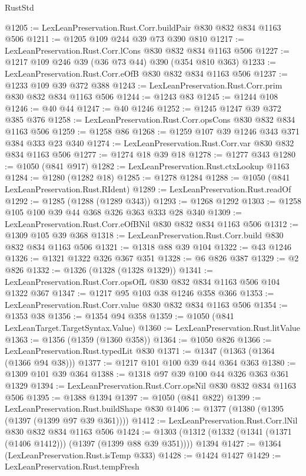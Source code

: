 \begin{lexlean}{RustStd}
\begin{coremodule}
@1205 := LexLeanPreservation.Rust.Corr.buildPair @830 @832 @834 @1163 @506
@1211 := @1205 @109 @244 @39 @73 @390 @810
@1217 := LexLeanPreservation.Rust.Corr.lCons @830 @832 @834 @1163 @506
@1227 := @1217 @109 @246 @39 (@36 @73 @44) @390 (@354 @810 @363)
@1233 := LexLeanPreservation.Rust.Corr.eOfB @830 @832 @834 @1163 @506
@1237 := @1233 @109 @39 @372 @388
@1243 := LexLeanPreservation.Rust.Corr.prim @830 @832 @834 @1163 @506
@1244 := @1243 @83
@1245 := @1244 @108
@1246 := @40 @44
@1247 := @40 @1246
@1252 := @1245 @1247 @39 @372 @385 @376
@1258 := LexLeanPreservation.Rust.Corr.opsCons @830 @832 @834 @1163 @506
@1259 := @1258 @86
@1268 := @1259 @107 @39 @1246 @343 @371 @384 @333 @23 @340
@1274 := LexLeanPreservation.Rust.Corr.var @830 @832 @834 @1163 @506
@1277 := @1274 @18 @39 @18
@1278 := @1277 @343
@1280 := @1050 (@841 @917)
@1282 := LexLeanPreservation.Rust.ctxLookup @1163
@1284 := @1280 (@1282 @18)
@1285 := @1278 @1284
@1288 := @1050 (@841 LexLeanPreservation.Rust.RIdent)
@1289 := LexLeanPreservation.Rust.readOf
@1292 := @1285 (@1288 (@1289 @343))
@1293 := @1268 @1292
@1303 := @1258 @105 @100 @39 @44 @368 @326 @363 @333 @28 @340
@1309 := LexLeanPreservation.Rust.Corr.eOfBNil @830 @832 @834 @1163 @506
@1312 := @1309 @105 @39 @368
@1318 := LexLeanPreservation.Rust.Corr.build @830 @832 @834 @1163 @506
@1321 := @1318 @88 @39 @104
@1322 := @43 @1246
@1326 := @1321 @1322 @326 @367 @351
@1328 := @6 @826 @387
@1329 := @2 @826
@1332 := @1326 (@1328 (@1328 @1329))
@1341 := LexLeanPreservation.Rust.Corr.opsOfL @830 @832 @834 @1163 @506 @104 @1322 @367
@1347 := @1217 @95 @103 @38 @1246 @358 @366
@1353 := LexLeanPreservation.Rust.Corr.value @830 @832 @834 @1163 @506
@1354 := @1353 @38
@1356 := @1354 @94 @358
@1359 := @1050 (@841 LexLeanTarget.TargetSyntax.Value)
@1360 := LexLeanPreservation.Rust.litValue
@1363 := @1356 (@1359 (@1360 @358))
@1364 := @1050 @826
@1366 := LexLeanPreservation.Rust.typedLit @830
@1371 := @1347 (@1363 (@1364 (@1366 @94 @38)))
@1377 := @1217 @101 @100 @39 @44 @364 @363
@1380 := @1309 @101 @39 @364
@1388 := @1318 @97 @39 @100 @44 @326 @363 @361 @1329
@1394 := LexLeanPreservation.Rust.Corr.opsNil @830 @832 @834 @1163 @506
@1395 := @1388 @1394
@1397 := @1050 (@841 @822)
@1399 := LexLeanPreservation.Rust.buildShape @830
@1406 := @1377 (@1380 (@1395 (@1397 (@1399 @97 @39 @361))))
@1412 := LexLeanPreservation.Rust.Corr.lNil @830 @832 @834 @1163 @506
@1424 := @1303 (@1312 (@1332 (@1341 (@1371 (@1406 @1412))) (@1397 (@1399 @88 @39 @351)))) @1394
@1427 := @1364 (LexLeanPreservation.Rust.isTemp @333)
@1428 := @1424 @1427
@1429 := LexLeanPreservation.Rust.tempFresh

\end{coremodule}
\end{lexlean}
